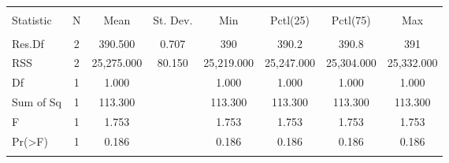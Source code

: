 
\begin{table}[!htbp] \centering 
  \caption{} 
  \label{} 
\begin{tabular}{@{\extracolsep{5pt}}lccccccc} 
\\[-1.8ex]\hline 
\hline \\[-1.8ex] 
Statistic & \multicolumn{1}{c}{N} & \multicolumn{1}{c}{Mean} & \multicolumn{1}{c}{St. Dev.} & \multicolumn{1}{c}{Min} & \multicolumn{1}{c}{Pctl(25)} & \multicolumn{1}{c}{Pctl(75)} & \multicolumn{1}{c}{Max} \\ 
\hline \\[-1.8ex] 
Res.Df & 2 & 390.500 & 0.707 & 390 & 390.2 & 390.8 & 391 \\ 
RSS & 2 & 25,275.000 & 80.150 & 25,219.000 & 25,247.000 & 25,304.000 & 25,332.000 \\ 
Df & 1 & 1.000 &  & 1.000 & 1.000 & 1.000 & 1.000 \\ 
Sum of Sq & 1 & 113.300 &  & 113.300 & 113.300 & 113.300 & 113.300 \\ 
F & 1 & 1.753 &  & 1.753 & 1.753 & 1.753 & 1.753 \\ 
Pr(\textgreater F) & 1 & 0.186 &  & 0.186 & 0.186 & 0.186 & 0.186 \\ 
\hline \\[-1.8ex] 
\end{tabular} 
\end{table} 
